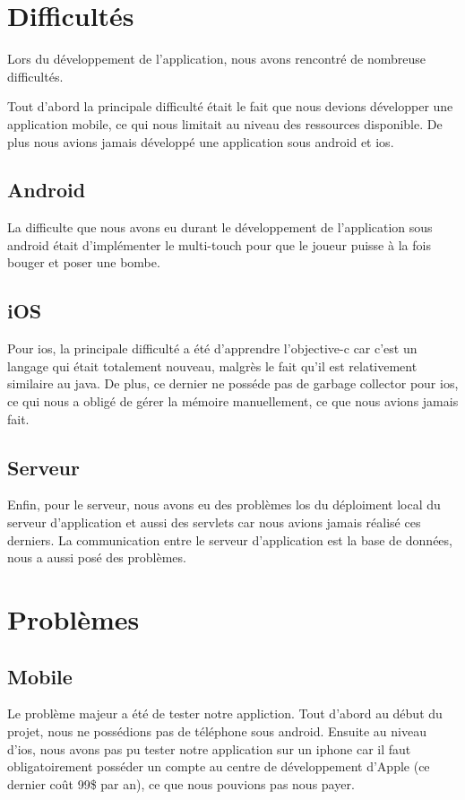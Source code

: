 \section{Difficultés}
	Lors du développement de l'application, nous avons rencontré de nombreuse difficultés.
	
	Tout d'abord la principale difficulté était le fait que nous devions développer une application mobile, ce qui nous limitait au niveau des ressources disponible. De plus nous avions jamais développé une application sous \gls{android} et \gls{ios}.
	
	\subsection{Android}
		La difficulte que nous avons eu durant le développement de l'application sous \gls{android} était d'implémenter le multi-touch pour que le joueur puisse à la fois bouger et poser une bombe.
	
	\subsection{iOS}
		Pour \gls{ios}, la principale difficulté a été d'apprendre l'\gls{objective-c} car c'est un langage qui était totalement nouveau, malgrès le fait qu'il est relativement similaire au \gls{java}. De plus, ce dernier ne posséde pas de garbage collector pour \gls{ios}, ce qui nous a obligé de gérer la mémoire manuellement, ce que nous avions jamais fait.
	
	\subsection{Serveur}
		Enfin, pour le serveur, nous avons eu des problèmes los du déploiment local du serveur d'application et aussi des servlets car nous avions jamais réalisé ces derniers. La communication entre le serveur d'application est la base de données, nous a aussi posé des problèmes.


\section{Problèmes}
	
	\subsection{Mobile}
		Le problème majeur a été de tester notre appliction. Tout d'abord au début du projet, nous ne possédions pas de téléphone sous \gls{android}. Ensuite au niveau d'\gls{ios}, nous avons pas pu tester notre application sur un \gls{iphone} car il faut obligatoirement posséder un compte au centre de développement d'Apple (ce dernier coût 99\$ par an), ce que nous pouvions pas nous payer.
		
